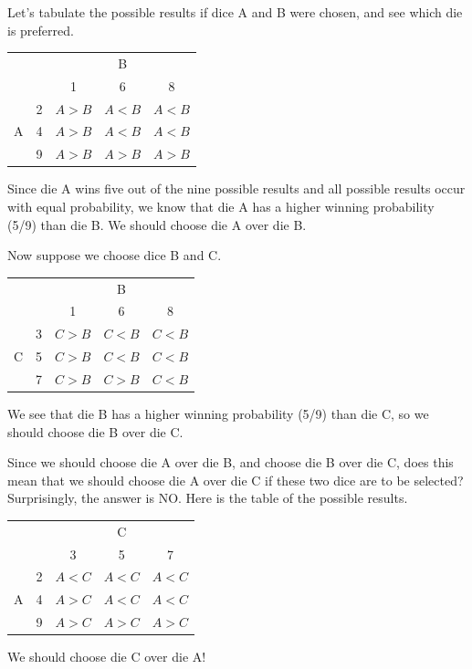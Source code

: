 Let's tabulate the possible results if dice A and B were chosen, and see which
die is preferred.  \begin{table}[H]
  \begin{tabular}{cc|ccc}
    \toprule
    &   & \multicolumn{3}{c}{B} \\
    &   & 1                & 6                & 8                \\
    \midrule
    \multirow{3}{*}{A}
    & 2 & \color{red}$A>B$ & $A<B$            & $A<B$            \\
    & 4 & \color{red}$A>B$ & $A<B$            & $A<B$            \\
    & 9 & \color{red}$A>B$ & \color{red}$A>B$ & \color{red}$A>B$ \\
    \bottomrule
  \end{tabular}
\end{table}
Since die A wins five out of the nine possible results and all possible results
occur with equal probability, we know that die A has a higher winning
probability (5/9) than die B. We should choose die A over die B.

Now suppose we choose dice B and C.
\begin{table}[H]
  \begin{tabular}{cc|ccc}
    \toprule
    &   & \multicolumn{3}{c}{B}                       \\
    &   & 1                & 6                & 8     \\
    \midrule
    \multirow{3}{*}{C}
    & 3 & \color{red}$C>B$ & $C<B$            & $C<B$ \\
    & 5 & \color{red}$C>B$ & $C<B$            & $C<B$ \\
    & 7 & \color{red}$C>B$ & \color{red}$C>B$ & $C<B$ \\
    \bottomrule
  \end{tabular}
\end{table}
We see that die B has a higher winning probability (5/9) than die C,
so we should choose die B over die C.

Since we should choose die A over die B, and choose die B over die C, does this
mean that we should choose die A over die C if these two dice are to be
selected? Surprisingly, the answer is NO. Here is the table of the possible
results.
\begin{table}[H]
  \begin{tabular}{cc|ccc}
    \toprule
    &   & \multicolumn{3}{c}{C} \\
    &   & 3                & 5                & 7                \\
    \midrule
    \multirow{3}{*}{A}
    & 2 & $A<C$            & $A<C$            & $A<C$            \\
    & 4 & \color{red}$A>C$ & $A<C$            & $A<C$            \\
    & 9 & \color{red}$A>C$ & \color{red}$A>C$ & \color{red}$A>C$ \\
    \bottomrule
  \end{tabular}
\end{table}
We should choose die C over die A!

